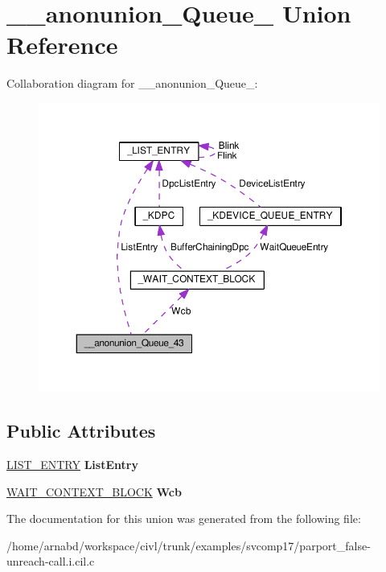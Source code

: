\hypertarget{union____anonunion__Queue__43}{}\section{\+\_\+\+\_\+anonunion\+\_\+\+Queue\+\_ Union Reference}
\label{union____anonunion__Queue__43}


Collaboration diagram for \+\_\+\+\_\+anonunion\+\_\+\+Queue\+\_\+:
\nopagebreak
\begin{figure}[H]
\begin{center}
\leavevmode
\includegraphics[width=350pt]{union____anonunion__Queue__43__coll__graph}
\end{center}
\end{figure}
\subsection*{Public Attributes}
\begin{DoxyCompactItemize}
\item 
\hypertarget{union____anonunion__Queue__43_a00c439428ea7e98c261213e977b8cca3}{}\hyperlink{struct__LIST__ENTRY}{L\+I\+S\+T\+\_\+\+E\+N\+T\+R\+Y} {\bfseries List\+Entry}\label{union____anonunion__Queue__43_a00c439428ea7e98c261213e977b8cca3}

\item 
\hypertarget{union____anonunion__Queue__43_ae2da2f20f0565bde176214140d539ab9}{}\hyperlink{struct__WAIT__CONTEXT__BLOCK}{W\+A\+I\+T\+\_\+\+C\+O\+N\+T\+E\+X\+T\+\_\+\+B\+L\+O\+C\+K} {\bfseries Wcb}\label{union____anonunion__Queue__43_ae2da2f20f0565bde176214140d539ab9}

\end{DoxyCompactItemize}


The documentation for this union was generated from the following file\+:\begin{DoxyCompactItemize}
\item 
/home/arnabd/workspace/civl/trunk/examples/svcomp17/parport\+\_\+false-\/unreach-\/call.\+i.\+cil.\+c\end{DoxyCompactItemize}
